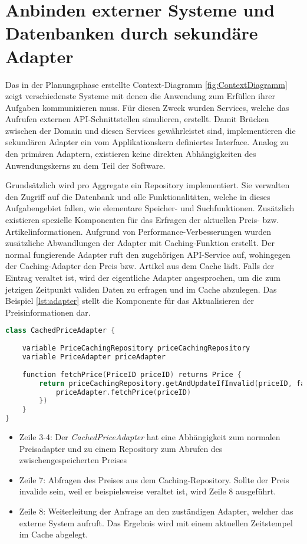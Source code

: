 \pagebreak

\section{Anbinden externer Systeme und Datenbanken durch sekundäre Adapter}

Das in der Planungsphase erstellte Context-Diagramm \ref{fig:ContextDiagramm} zeigt verschiedenste Systeme mit denen die Anwendung zum Erfüllen ihrer Aufgaben kommunizieren muss. Für diesen Zweck wurden Services, welche das Aufrufen externen API-Schnittstellen simulieren, erstellt. Damit Brücken zwischen der Domain und diesen Services gewährleistet sind, implementieren die sekundären Adapter ein vom Applikationskern definiertes Interface. Analog zu den primären Adaptern, existieren keine direkten Abhängigkeiten des Anwendungskerns zu dem Teil der Software.

Grundsätzlich wird pro Aggregate ein Repository implementiert. Sie verwalten den Zugriff auf die Datenbank und alle Funktionalitäten, welche in dieses Aufgabengebiet fallen, wie elementare Speicher- und Suchfunktionen. Zusätzlich existieren spezielle Komponenten für das Erfragen der aktuellen Preis- bzw. Artikelinformationen. Aufgrund von Performance-Verbesserungen wurden zusätzliche Abwandlungen der Adapter mit Caching-Funktion erstellt. Der normal fungierende Adapter ruft den zugehörigen API-Service auf, wohingegen der Caching-Adapter den Preis bzw. Artikel aus dem Cache lädt. Falls der Eintrag veraltet ist, wird der eigentliche Adapter angesprochen, um die zum jetzigen Zeitpunkt validen Daten zu erfragen und im Cache abzulegen. Das Beispiel \ref{lst:adapter} stellt die Komponente für das Aktualisieren der Preisinformationen dar. 

\vspace{0,5cm}
\begin{minipage}{\linewidth} %
	\begin{lstlisting}[caption={Preisadapter mit Caching-Funktion}, label={lst:adapter}, language=Kotlin]
class CachedPriceAdapter {
	
	variable PriceCachingRepository priceCachingRepository 
	variable PriceAdapter priceAdapter
	
	function fetchPrice(PriceID priceID) returns Price {
		return priceCachingRepository.getAndUpdateIfInvalid(priceID, fallback = {
			priceAdapter.fetchPrice(priceID)
		})
	}
}
	\end{lstlisting}
	\begin{itemize}
		\setlength\itemsep{-1pt}
		\item Zeile 3-4: Der \emph{CachedPriceAdapter} hat eine Abhängigkeit zum normalen Preisadapter und zu einem Repository zum Abrufen des zwischengespeicherten Preises
		\item Zeile 7: Abfragen des Preises aus dem Caching-Repository. Sollte der Preis invalide sein, weil er beispielsweise veraltet ist, wird Zeile 8 ausgeführt.
		\item Zeile 8: Weiterleitung der Anfrage an den zuständigen Adapter, welcher das externe System aufruft. Das Ergebnis wird mit einem aktuellen Zeitstempel im Cache abgelegt.
	\end{itemize}
\end{minipage}

